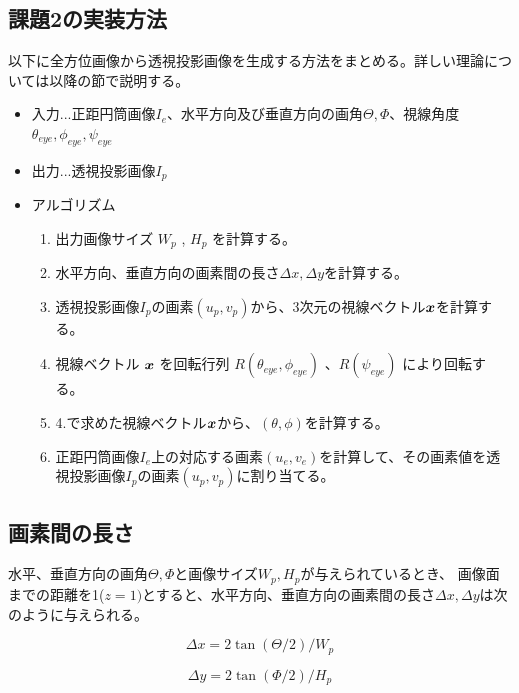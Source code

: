 \documentclass[]{jarticle}          %
\begin{document}
\subsection{課題2の実装方法}
以下に全方位画像から透視投影画像を生成する方法をまとめる\cite{bib_1}。詳しい理論については以降の節で説明する。
\begin{itemize}
  \item 入力...正距円筒画像${I_e}$、水平方向及び垂直方向の画角${\Theta,\Phi}$、視線角度 ${\theta_{eye},\phi_{eye},\psi_{eye}}$
  \item 出力...透視投影画像${I_p}$
  \item アルゴリズム
  \begin{enumerate}
    \item 出力画像サイズ $W_{p}$ , $H_{p}$ を計算する。
    \item 水平方向、垂直方向の画素間の長さ${Δx,Δy}$を計算する。
    \item 透視投影画像${I_p}$の画素${(u_p,v_p)}$から、3次元の視線ベクトル$\mbox{\boldmath $x$}$を計算する。
    \item 視線ベクトル $\mbox{\boldmath $x$}$ を回転行列 $R(\theta_{eye},\phi_{eye})$ 、$R(\psi_{eye})$ により回転する。
    \item 4.で求めた視線ベクトル$\mbox{\boldmath $x$}$から、${(\theta,\phi)}$を計算する。
    \item 正距円筒画像${I_e}$上の対応する画素${(u_e,v_e)}$を計算して、その画素値を透視投影画像${I_p}$の画素${(u_p,v_p)}$に割り当てる。
  \end{enumerate}
\end{itemize}

\subsection{画素間の長さ}
水平、垂直方向の画角${\Theta,\Phi}$と画像サイズ${W_p,H_p}$が与えられているとき、
画像面までの距離を1(${z=1})$とすると、水平方向、垂直方向の画素間の長さ${Δx,Δy}$は次のように与えられる。

\begin{equation}
  Δx = 2\tan(\Theta/2)/W_p
  \label{eq7}
\end{equation}

\begin{equation}
  Δy = 2\tan(\Phi/2)/H_p
  \label{eq8}
\end{equation}
\end{document}
